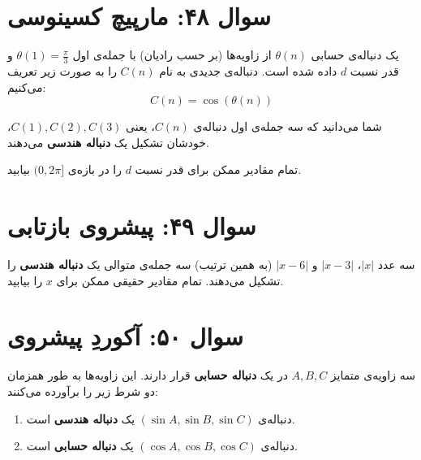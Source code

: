 \documentclass[12pt]{article}
\begin{document}
	\section*{سوال ۴۸: مارپیچ کسینوسی }
	یک دنباله‌ی حسابی \( \theta(n) \) از زاویه‌ها (بر حسب رادیان) با جمله‌ی اول \( \theta(1) = \frac{\pi}{3} \) و قدر نسبت \(d\) داده شده است. دنباله‌ی جدیدی به نام \(C(n)\) را به صورت زیر تعریف می‌کنیم:
	\begin{displaymath}
		C(n) = \cos(\theta(n))
	\end{displaymath}
	\vspace{0.5cm}
	
	شما می‌دانید که سه جمله‌ی اول دنباله‌ی \(C(n)\)، یعنی \(C(1), C(2), C(3)\)، خودشان تشکیل یک \textbf{دنباله هندسی} می‌دهند.
	\vspace{0.5cm}
	
	تمام مقادیر ممکن برای قدر نسبت \(d\) را در بازه‌ی \( (0, 2\pi] \) بیابید.
	
	\vspace{1cm}
	\hrulefill
	\vspace{1cm}
	
	\section*{سوال ۴۹: پیشروی بازتابی }
	سه عدد \(|x|\)، \(|x - 3|\) و \(|x - 6|\) (به همین ترتیب) سه جمله‌ی متوالی یک \textbf{دنباله هندسی} را تشکیل می‌دهند. تمام مقادیر حقیقی ممکن برای \(x\) را بیابید.
	
	\vspace{1cm}
	\hrulefill
	\vspace{1cm}
	
	\section*{سوال ۵۰: آکوردِ پیشروی }
	سه زاویه‌ی متمایز \(A, B, C\) در یک \textbf{دنباله حسابی} قرار دارند. این زاویه‌ها به طور همزمان دو شرط زیر را برآورده می‌کنند:
	\begin{enumerate}[label=(\roman*)]
		\item دنباله‌ی \((\sin A, \sin B, \sin C)\) یک \textbf{دنباله هندسی} است.
		\item دنباله‌ی \((\cos A, \cos B, \cos C)\) یک \textbf{دنباله حسابی} است.
	\end{enumerate}
	\vspace{0.5cm}
	
\end{document}
